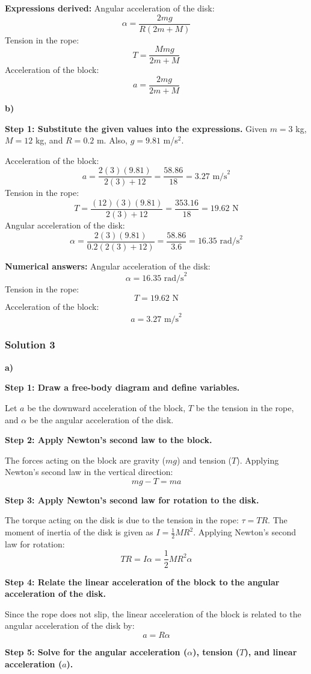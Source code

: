 \documentclass{article}
\begin{document}
\textbf{Expressions derived:}
Angular acceleration of the disk: $$\alpha = \frac{2mg}{R(2m+M)}$$
Tension in the rope: $$T = \frac{Mmg}{2m+M}$$
Acceleration of the block: $$a = \frac{2mg}{2m+M}$$

\textbf{b)}

\textbf{Step 1: Substitute the given values into the expressions.}
Given $m = 3$ kg, $M = 12$ kg, and $R = 0.2$ m. Also, $g = 9.81$ m/s$^2$.

Acceleration of the block:
$$a = \frac{2(3)(9.81)}{2(3) + 12} = \frac{58.86}{18} = 3.27 \text{ m/s}^2$$
Tension in the rope:
$$T = \frac{(12)(3)(9.81)}{2(3) + 12} = \frac{353.16}{18} = 19.62 \text{ N}$$
Angular acceleration of the disk:
$$\alpha = \frac{2(3)(9.81)}{0.2(2(3) + 12)} = \frac{58.86}{3.6} = 16.35 \text{ rad/s}^2$$

\textbf{Numerical answers:}
Angular acceleration of the disk: $$\alpha = 16.35 \text{ rad/s}^2$$
Tension in the rope: $$T = 19.62 \text{ N}$$
Acceleration of the block: $$a = 3.27 \text{ m/s}^2$$


\subsubsection{Solution 3}
\textbf{a)}

\textbf{Step 1: Draw a free-body diagram and define variables.}

Let $a$ be the downward acceleration of the block, $T$ be the tension in the rope, and $\alpha$ be the angular acceleration of the disk.

\textbf{Step 2: Apply Newton's second law to the block.}

The forces acting on the block are gravity ($mg$) and tension ($T$). Applying Newton's second law in the vertical direction:
\[mg - T = ma\]

\textbf{Step 3: Apply Newton's second law for rotation to the disk.}

The torque acting on the disk is due to the tension in the rope: $\tau = TR$.
The moment of inertia of the disk is given as $I = \frac{1}{2}MR^2$.
Applying Newton's second law for rotation:
\[TR = I\alpha = \frac{1}{2}MR^2 \alpha\]

\textbf{Step 4: Relate the linear acceleration of the block to the angular acceleration of the disk.}

Since the rope does not slip, the linear acceleration of the block is related to the angular acceleration of the disk by:
\[a = R\alpha\]

\textbf{Step 5: Solve for the angular acceleration ($\alpha$), tension ($T$), and linear acceleration ($a$).}
\end{document}
